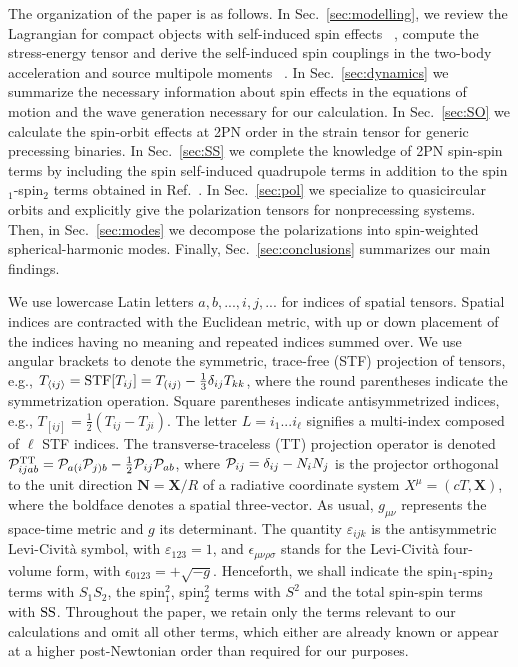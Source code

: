 \documentclass[aps, prd,
twocolumn,%
superscriptaddress,
showpacs, nofootinbib, eqsecnum, amsmath, amssymb, floatfix
]{revtex4}
\begin{document}
The organization of the paper is as follows. In
Sec.~\ref{sec:modelling}, we review the Lagrangian for compact
objects with self-induced spin effects
~\cite{1980AnPhy.130..188B,PortoRothstein2006,Porto:2008jj,Steinhoff:2010zz},
compute the stress-energy tensor and derive the self-induced spin
couplings in the two-body acceleration and source multipole moments
~\cite{Poisson:1997ha,Damour01c,Steinhoff:2010zz,Porto:2012x}. In
Sec.~\ref{sec:dynamics} we summarize the necessary information about
spin effects in the equations of motion and the wave generation
necessary for our calculation. In Sec.~\ref{sec:SO} we calculate the
spin-orbit effects at 2PN order in the strain tensor for generic
precessing binaries. In Sec.~\ref{sec:SS} we complete the knowledge
of 2PN spin-spin terms by including the spin self-induced quadrupole
terms in addition to the spin${}_1$-spin${}_2$ terms obtained in
Ref.~\cite{Kidder:1995zr}. In Sec.~\ref{sec:pol} we specialize to
quasicircular orbits and explicitly give the polarization tensors
for nonprecessing systems. Then, in Sec.~\ref{sec:modes} we
decompose the polarizations into spin-weighted spherical-harmonic
modes. Finally, Sec.~\ref{sec:conclusions} summarizes our main
findings.

We use lowercase Latin letters $a, b, ..., i, j, ...$ for indices of spatial
tensors. Spatial indices are contracted with the Euclidean metric, with up or
down placement of the indices having no meaning and repeated indices summed
over. We use angular brackets to denote the symmetric, trace-free (STF)
projection of tensors, e.g., $T_{\langle ij\rangle} = {\rm
  STF}[T_{ij}]=T_{(ij)}-\frac{1}{3}\delta_{ij}T_{kk}$, where the round
parentheses indicate the symmetrization operation. Square
parentheses indicate antisymmetrized indices, e.g., $T_{[ij]} =
\frac{1}{2} (T_{ij} - T_{ji})$. The letter $L=i_1... i_\ell$
signifies a multi-index composed of $\ell$ STF indices. The
transverse-traceless (TT) projection operator is denoted ${\cal
P}_{ijab}^\mathrm{TT}={\cal P}_{a(i}{\cal
  P}_{j)b}-\frac{1}{2}{\cal P}_{ij}{\cal P}_{ab}$, where ${\cal
  P}_{ij}=\delta_{ij}-N_iN_j$ is the projector orthogonal to the unit
direction $\bm{N}=\bm{X}/R$ of a radiative coordinate system
$X^\mu=(cT, \bm{X})$, where the boldface denotes a spatial
three-vector. As usual, $g_{\mu\nu}$ represents the space-time
metric and $g$ its determinant. The quantity $\varepsilon_{ijk}$ is
the antisymmetric Levi-Civit\`a symbol, with $\varepsilon_{123}=1$,
and $\epsilon_{\mu\nu\rho\sigma}$ stands for the Levi-Civit\`a
four-volume form, with $\epsilon_{0123} = + \sqrt{-g}$. Henceforth,
we shall indicate the spin${}_1$-spin${}_2$ terms with $S_1S_2$, the
spin${}^2_1$, spin${}^2_2$ terms with $S^2$ and the total spin-spin
terms with ${\rm SS}$. Throughout the paper, we retain only the
terms relevant to our calculations and omit all other terms, which
either are already known or appear at a higher post-Newtonian order
than required for our purposes.
\end{document}

